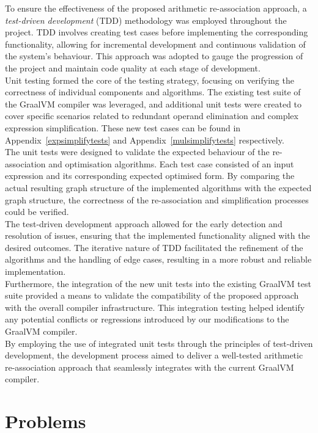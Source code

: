 \documentclass[12pt,openany,a4paper]{book}
\newcommand{\app}[1]  {Appendix~\ref{#1}}   %
\begin{document}
To ensure the effectiveness of the proposed arithmetic re-association approach,
a \emph{test-driven development} (TDD) methodology was employed throughout the
project. TDD involves creating test cases before implementing the corresponding
functionality, allowing for incremental development and continuous validation
of the system's behaviour. This approach was adopted to gauge the progression
of the project and maintain code quality at each stage of development. \\
Unit testing formed the core of the testing strategy, focusing on verifying
the correctness of individual components and algorithms. The existing test
suite of the GraalVM compiler was leveraged, and additional unit tests were
created to cover specific scenarios related to redundant operand elimination
and complex expression simplification. These new test cases can be found in
\app{expsimplifytests} and \app{mulsimplifytests} respectively. \\
The unit tests were designed to validate the expected behaviour of the 
re-association and optimisation algorithms. Each test case consisted of an input
expression and its corresponding expected optimised form. By comparing the
actual resulting graph structure of the implemented algorithms with the expected
graph structure, the correctness of the re-association and simplification
processes could be verified. \\
The test-driven development approach allowed for the early detection and 
resolution of issues, ensuring that the implemented functionality aligned
with the desired outcomes. The iterative nature of TDD facilitated the
refinement of the algorithms and the handling of edge cases, resulting in a
more robust and reliable implementation. \\
Furthermore, the integration of the new unit tests into the existing GraalVM
test suite provided a means to validate the compatibility of the proposed
approach with the overall compiler infrastructure. This integration testing
helped identify any potential conflicts or regressions introduced by our
modifications to the GraalVM compiler. \\
By employing the use of integrated unit tests through the principles of 
test-driven development, the development process aimed to deliver a
well-tested arithmetic re-association approach that seamlessly integrates with
the current GraalVM compiler.

\section{Problems}
\label{problems}
\end{document}
